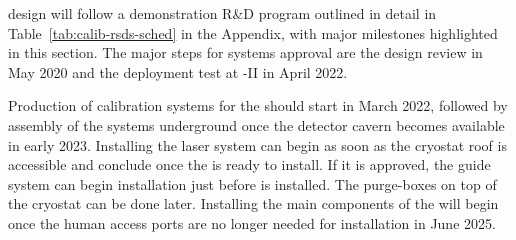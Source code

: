 design will follow a demonstration R\&D program outlined in detail in Table~\ref{tab:calib-rsds-sched} in the Appendix, with major milestones highlighted in this section. The major steps for systems approval are the design review in May 2020 and the deployment test at -II in April 2022. 

Production of calibration systems for the  should start in March 2022, followed by assembly of the systems underground once the detector cavern becomes available in early 2023. Installing the laser system can begin as soon as the cryostat roof is accessible and conclude once the  is ready to install. If it is approved, the  guide system can begin installation just before is installed. The purge-boxes on top of the cryostat can be done later.
Installing the main components of the  will begin once the human access ports are no longer needed for  installation in June 2025. 
